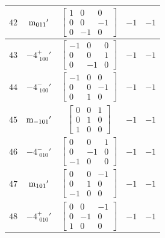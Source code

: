 \documentclass[fleqn,8pt]{jsarticle}
\begin{document}
\begin{longtable}{ccccc}
$ 42 $ & $ {\rm m}_{011}{}' $ & $ \begin{bmatrix} 1 & 0 & 0 \\ 0 & 0 & -1 \\ 0 & -1 & 0 \end{bmatrix} $ & $ -1 $ & $ -1 $ \\ \hline
$ 43 $ & $ -4^{+}_{\,\,100}{}' $ & $ \begin{bmatrix} -1 & 0 & 0 \\ 0 & 0 & 1 \\ 0 & -1 & 0 \end{bmatrix} $ & $ -1 $ & $ -1 $ \\ \hline
$ 44 $ & $ -4^{-}_{\,\,100}{}' $ & $ \begin{bmatrix} -1 & 0 & 0 \\ 0 & 0 & -1 \\ 0 & 1 & 0 \end{bmatrix} $ & $ -1 $ & $ -1 $ \\ \hline
$ 45 $ & $ {\rm m}_{-101}{}' $ & $ \begin{bmatrix} 0 & 0 & 1 \\ 0 & 1 & 0 \\ 1 & 0 & 0 \end{bmatrix} $ & $ -1 $ & $ -1 $ \\ \hline
$ 46 $ & $ -4^{-}_{\,\,010}{}' $ & $ \begin{bmatrix} 0 & 0 & 1 \\ 0 & -1 & 0 \\ -1 & 0 & 0 \end{bmatrix} $ & $ -1 $ & $ -1 $ \\ \hline
$ 47 $ & $ {\rm m}_{101}{}' $ & $ \begin{bmatrix} 0 & 0 & -1 \\ 0 & 1 & 0 \\ -1 & 0 & 0 \end{bmatrix} $ & $ -1 $ & $ -1 $ \\ \hline
$ 48 $ & $ -4^{+}_{\,\,010}{}' $ & $ \begin{bmatrix} 0 & 0 & -1 \\ 0 & -1 & 0 \\ 1 & 0 & 0 \end{bmatrix} $ & $ -1 $ & $ -1 $ \\
\end{longtable}
\end{document}
